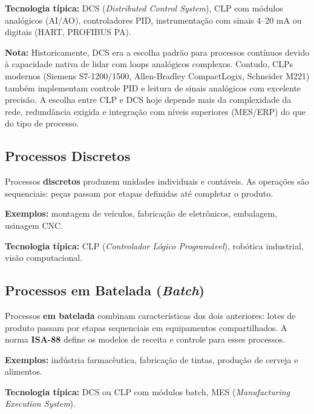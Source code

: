 \textbf{Tecnologia típica:} DCS (\emph{Distributed Control System}), CLP com módulos analógicos (AI/AO), controladores PID, instrumentação com sinais 4--20 mA ou digitais (HART, PROFIBUS PA).

\begin{caixanota}

\textbf{Nota:} Historicamente, DCS era a escolha padrão para processos contínuos devido à capacidade nativa de lidar com loops analógicos complexos. Contudo, CLPs modernos (Siemens S7-1200/1500, Allen-Bradley CompactLogix, Schneider M221) também implementam controle PID e leitura de sinais analógicos com excelente precisão. A escolha entre CLP e DCS hoje depende mais da complexidade da rede, redundância exigida e integração com níveis superiores (MES/ERP) do que do tipo de processo.

\end{caixanota}

\subsection{Processos Discretos}\label{processos-discretos}

Processos \textbf{discretos} produzem unidades individuais e contáveis. As operações são sequenciais: peças passam por etapas definidas até completar o produto.

\textbf{Exemplos:} montagem de veículos, fabricação de eletrônicos, embalagem, usinagem CNC.

\textbf{Tecnologia típica:} CLP (\emph{Controlador Lógico Programável}), robótica industrial, visão computacional.

\subsection{\texorpdfstring{Processos em Batelada (\emph{Batch})}{Processos em Batelada (Batch)}}\label{processos-em-batelada-batch}

Processos \textbf{em batelada} combinam características dos dois anteriores: lotes de produto passam por etapas sequenciais em equipamentos compartilhados. A norma \textbf{ISA-88} define os modelos de receita e controle para esses processos.

\textbf{Exemplos:} indústria farmacêutica, fabricação de tintas, produção de cerveja e alimentos.

\textbf{Tecnologia típica:} DCS ou CLP com módulos batch, MES (\emph{Manufacturing Execution System}).

